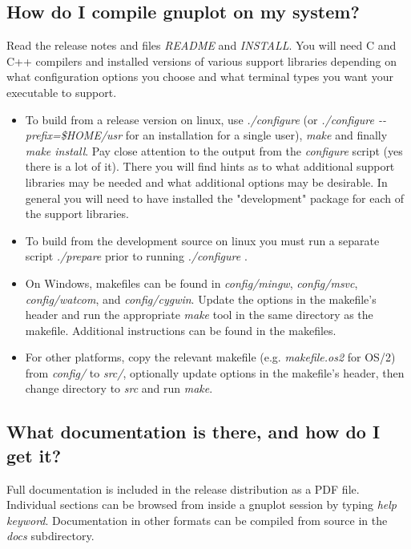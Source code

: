 \documentclass[letter,11pt]{article}
\newcommand{\gnuplot}{\textbf{gnuplot }}
\begin{document}
{\subsection{How do I compile \gnuplot on my system?}

Read the release notes and files \textit{README} and \textit{INSTALL}.
You will need C and C++ compilers and installed versions of various
support libraries depending on what configuration options you choose and what
terminal types you want your executable to support.

\begin{itemize}
\item
To build from a release version on linux, use \textit{./configure} (or \textit{./configure {-}{-}prefix=\$HOME/usr}
for an installation for a single user), \textit{make} and finally
\textit{make install}.  Pay close attention to the output from the \textit{configure}
script (yes there is a lot of it).
There you will find hints as to what additional support libraries may be needed and
what additional options may be desirable.  In general you will need to have installed
the "development" package for each of the support libraries.
\item
To build from the development source on linux you must run a separate script \textit{./prepare}
prior to running \textit{./configure} .
\item
On Windows, makefiles can be found in \textit{config/mingw}, \textit{config/msvc},
\textit{config/watcom}, and \textit{config/cygwin}. Update the options in the
makefile's header and run the appropriate \textit{make} tool in the same directory
as the makefile. Additional instructions can be found in the makefiles.
\item
For other platforms, copy the relevant makefile (e.g. \textit{makefile.os2} for
OS/2) from \textit{config/} to \textit{src/}, optionally update options in the
makefile's header, then change directory to \textit{src} and run \textit{make}.
\end{itemize}


\subsection{What documentation is there, and how do I get it?}

Full documentation is included in the release distribution as a PDF file.
Individual sections can be browsed from inside a gnuplot session
by typing \textit{help {\em keyword}}.
Documentation in other formats can be compiled from source in the
{\em docs} subdirectory.

}
\end{document}
